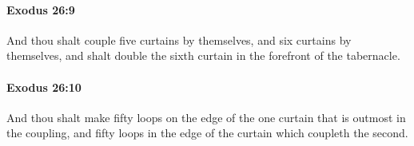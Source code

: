 		\paragraph{Exodus 26:9} %
			\label{EXODUS-26-9}

			And thou shalt couple five curtains by themselves, and six curtains by themselves, and shalt double the sixth curtain in the forefront of the tabernacle.


		\paragraph{Exodus 26:10} %
			\label{EXODUS-26-10}

			And thou shalt make fifty loops on the edge of the one curtain that is outmost in the coupling, and fifty loops in the edge of the curtain which coupleth the second.


